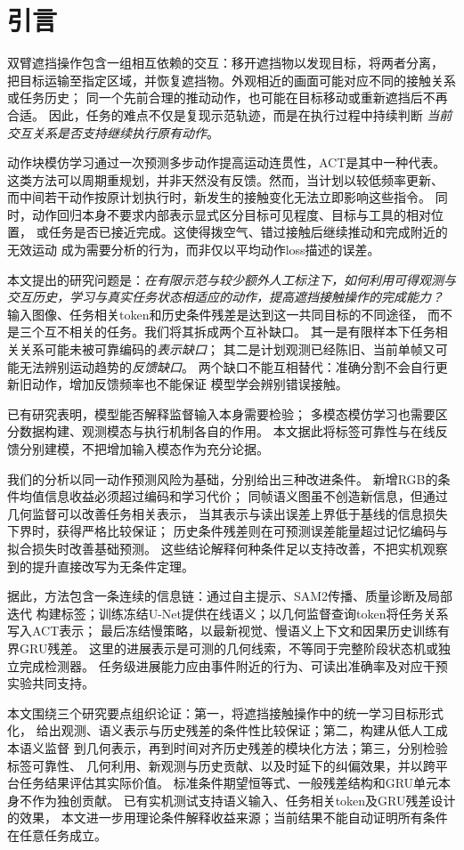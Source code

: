\section{引言}
双臂遮挡操作包含一组相互依赖的交互：移开遮挡物以发现目标，将两者分离，
把目标运输至指定区域，并恢复遮挡物。外观相近的画面可能对应不同的接触关系或任务历史；
同一个先前合理的推动动作，也可能在目标移动或重新遮挡后不再合适。
因此，任务的难点不仅是复现示范轨迹，而是在执行过程中持续判断
\emph{当前交互关系是否支持继续执行原有动作}。

动作块模仿学习通过一次预测多步动作提高运动连贯性，ACT是其中一种代表\cite{zhao2023act}。
这类方法可以周期重规划，并非天然没有反馈。然而，当计划以较低频率更新、
而中间若干动作按原计划执行时，新发生的接触变化无法立即影响这些指令。
同时，动作回归本身不要求内部表示显式区分目标可见程度、目标与工具的相对位置，
或任务是否已接近完成。这使得拨空气、错过接触后继续推动和完成附近的无效运动
成为需要分析的行为，而非仅以平均动作loss描述的误差。

本文提出的研究问题是：\emph{在有限示范与较少额外人工标注下，如何利用可得观测与
交互历史，学习与真实任务状态相适应的动作，提高遮挡接触操作的完成能力？}
输入图像、任务相关token和历史条件残差是达到这一共同目标的不同途径，
而不是三个互不相关的任务。我们将其拆成两个互补缺口。
其一是有限样本下任务相关关系可能未被可靠编码的\emph{表示缺口}；
其二是计划观测已经陈旧、当前单帧又可能无法辨别运动趋势的\emph{反馈缺口}。
两个缺口不能互相替代：准确分割不会自行更新旧动作，增加反馈频率也不能保证
模型学会辨别错误接触。

已有研究表明，模型能否解释监督输入本身需要检验\cite{bobu2020}；
多模态模仿学习也需要区分数据构建、观测模态与执行机制各自的作用\cite{ablett2025}。
本文据此将标签可靠性与在线反馈分别建模，不把增加输入模态作为充分论据。

我们的分析以同一动作预测风险为基础，分别给出三种改进条件。
新增RGB的条件均值信息收益必须超过编码和学习代价；
同帧语义图虽不创造新信息，但通过几何监督可以改善任务相关表示，
当其表示与读出误差上界低于基线的信息损失下界时，获得严格比较保证；
历史条件残差则在可预测误差能量超过记忆编码与拟合损失时改善基础预测。
这些结论解释何种条件足以支持改善，不把实机观察到的提升直接改写为无条件定理。

据此，方法包含一条连续的信息链：通过自主提示、SAM2传播、质量诊断及局部迭代
构建标签；训练冻结U-Net提供在线语义；以几何监督查询token将任务关系写入ACT表示；
最后冻结慢策略，以最新视觉、慢语义上下文和因果历史训练有界GRU残差。
这里的进展表示是可测的几何线索，不等同于完整阶段状态机或独立完成检测器。
任务级进展能力应由事件附近的行为、可读出准确率及对应干预实验共同支持。

本文围绕三个研究要点组织论证：第一，将遮挡接触操作中的统一学习目标形式化，
给出观测、语义表示与历史残差的条件性比较保证；第二，构建从低人工成本语义监督
到几何表示，再到时间对齐历史残差的模块化方法；第三，分别检验标签可靠性、
几何利用、新观测与历史贡献、以及时延下的纠偏效果，并以跨平台任务结果评估其实际价值。
标准条件期望恒等式、一般残差结构和GRU单元本身不作为独创贡献。
已有实机测试支持语义输入、任务相关token及GRU残差设计的效果，
本文进一步用理论条件解释收益来源；当前结果不能自动证明所有条件在任意任务成立。
